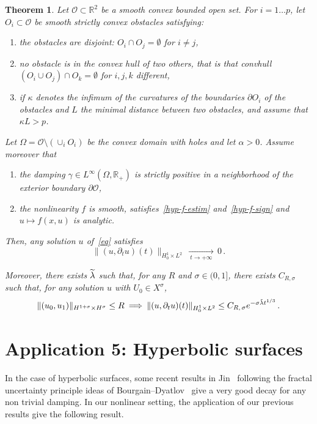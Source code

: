 \documentclass[10pt]{amsart}
\newtheorem{theo}{Theorem}[section]
\theoremstyle{definition}\newtheorem{defi}[theo]{Definition}\newtheorem{rema}[theo]{Remark}\newtheorem{exam}[theo]{Example}\newtheorem{exem}[theo]{Example}\newtheorem{nota}[theo]{Notation}
\newcommand{\RR}{\mathbb{R}}
\newcommand{\Oc}{\mathcal{O}}
\newcommand*{\alphenumi}{\renewcommand*{\theenumi}{\alph{enumi}}}
\let\oldtilde\tilde
\renewcommand*{\tilde}[1]{\mathchoice{\widetilde{#1}}{\widetilde{#1}}{\oldtilde{#1}}{\oldtilde{#1}}}\let\oldexists\exists
\renewcommand*{\exists}{\mathrel{\oldexists}}
\begin{document}
\begin{theo}\label{th-appli4}
Let $\Oc\subset\RR^2$ be a smooth convex bounded open set. For $i=1\ldots p$, let $O_i\subset \Oc$ be smooth strictly convex obstacles satisfying:
\begin{enumerate}\alphenumi
\item \label{listtheo11.1.1}the obstacles are disjoint: $O_i\cap O_j=\emptyset$ for $i\neq j$,
\item \label{listtheo11.1.2}no obstacle is in the convex hull of two others, that is that \emph{ convhull}$(O_i\cup O_j)\cap O_k =\emptyset$ for $i,j,k$ different,
\item \label{listtheo11.1.3}if $\kappa$ denotes the infimum of the curvatures of the boundaries $\partial O_i$ of the obstacles and $L$ the minimal distance between two obstacles, and assume that $\kappa L>p$.
\end{enumerate}
Let $\Omega=\Oc\setminus (\cup_i O_i)$ be the convex domain with holes and let $\alpha>0$. Assume moreover that
\setcounter{enumi}{3}
\begin{enumerate}\alphenumi
\item \label{listtheo11.1.4}the damping $\gamma\in L^\infty(\Omega,\RR_+)$ is strictly positive in a neighborhood of the exterior boundary $\partial \Oc$,
\item \label{listtheo11.1.5}the nonlinearity $f$ is smooth, satisfies~\eqref{hyp-f-estim} and~\eqref{hyp-f-sign} and $u\mapsto f(x,u)$ is analytic.
\end{enumerate}

Then, any solution $u$ of~\eqref{eq} satisfies
\[
\|(u,\partial_t u)(t)\|_{H^1_0\times L^2}\,\xrightarrow[\:t\longrightarrow
+\infty\:]{}\,0\,.
\]

Moreover, there exists $\tilde\lambda$ such that, for any $R$ and $\sigma\in (0,1]$, there exists $C_{R,\sigma}$ such that, for any solution $u$ with $U_0\in X^\sigma$,
\[
\|(u_0,u_1)\|_{H^{1+\sigma}\times H^\sigma}\leq
R\:\Longrightarrow\:\|(u,\partial_t u)(t)\|_{H^1_0\times L^2} \leq
C_{R,\,\sigma}e^{-\sigma\tilde \lambda{t}^{1/3}}\,.
\]
\end{theo}



\section{Application 5: Hyperbolic surfaces}\label{section-hyperbo}
In the case of hyperbolic surfaces, some recent results in Jin~\cite{Lin} following the fractal uncertainty principle ideas of Bourgain--Dyatlov~\cite{BourgainDyatlov} give a very good decay for any non trivial damping. In our nonlinear setting, the application of our previous results give the following result.
\end{document}
